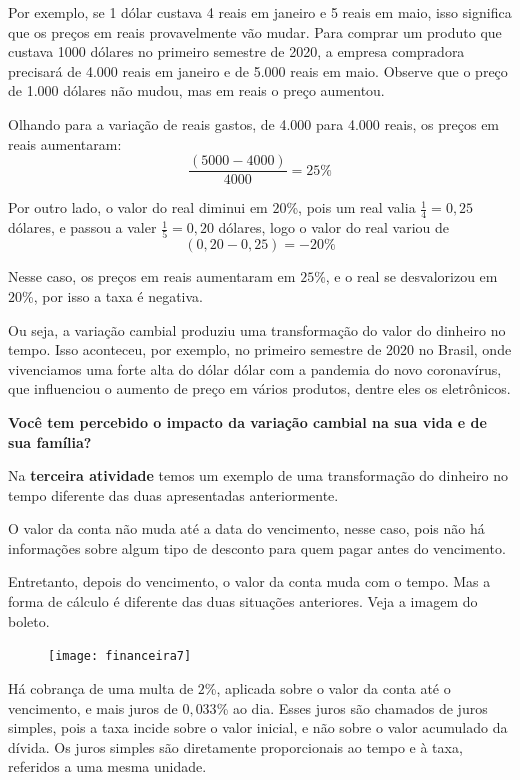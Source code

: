 Por exemplo, se 1 dólar custava 4 reais em janeiro e 5 reais em maio, isso significa que os preços em reais provavelmente vão mudar. Para comprar um produto que custava 1000 dólares no primeiro semestre de 2020, a empresa compradora precisará de 4.000 reais em janeiro e de 5.000 reais em maio. Observe que o preço de 1.000 dólares não mudou, mas em reais o preço aumentou.

Olhando para a variação de reais gastos, de 4.000 para 4.000 reais, os preços em reais aumentaram:
\begin{equation*}
\frac{(5000-4000)}{4000}=25\%
\end{equation*}

Por outro lado, o valor do real diminui em $20$\%, pois um real valia $\displaystyle\frac{1}{4}=0{,}25$ dólares, e passou a valer $\displaystyle\frac{1}{5}=0{,}20$ dólares, logo o valor do real variou de 
\begin{equation*}
(0{,}20-0{,}25)=-20\%
\end{equation*}

Nesse caso, os preços em reais aumentaram em $25$\%, e o real se desvalorizou em $20$\%, por isso a taxa é negativa.

Ou seja, a variação cambial produziu uma transformação do valor do dinheiro no tempo. Isso aconteceu, por exemplo, no primeiro semestre de 2020 no Brasil, onde vivenciamos uma forte alta do dólar dólar com a pandemia do novo coronavírus, que influenciou o aumento de preço em vários produtos, dentre eles os eletrônicos.

\textbf{Você tem percebido o impacto da variação cambial na sua vida e de sua família?}

Na \textbf{terceira atividade} temos um exemplo de uma transformação do dinheiro no tempo diferente das duas apresentadas anteriormente.

O valor da conta não muda até a data do vencimento, nesse caso, pois não há informações sobre algum tipo de desconto para quem pagar antes do vencimento.

Entretanto, depois do vencimento, o valor da conta muda com o tempo. Mas a forma de cálculo é diferente das duas situações anteriores. Veja a imagem do boleto.

\begin{figure}[H]
\centering

\texttt{[image: financeira7]}
\end{figure}

Há cobrança de uma multa de $2$\%, aplicada sobre o valor da conta até o vencimento, e mais juros de $0{,}033$\% ao dia. Esses juros são chamados de juros simples, pois a taxa incide sobre o valor inicial, e não sobre o valor acumulado da dívida. Os juros simples são diretamente proporcionais ao tempo e à taxa, referidos a uma mesma unidade.

